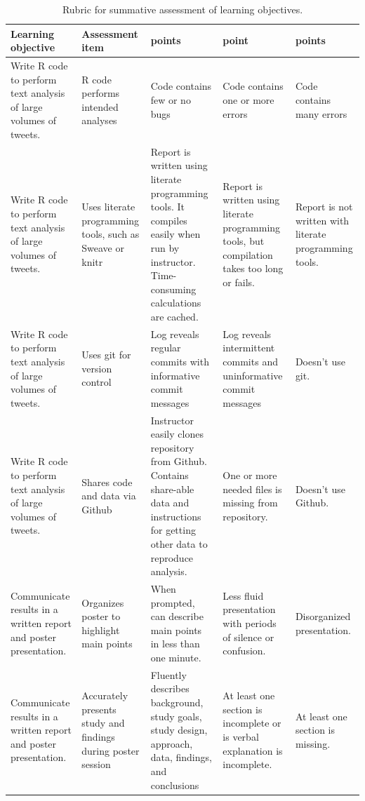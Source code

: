 \documentclass[
]{article}
\begin{document}
\begin{table}

\caption{\label{tab:summative}Rubric for summative assessment of learning objectives.}
\centering
\fontsize{6}{8}\selectfont
\begin{tabular}[t]{>{\raggedright\arraybackslash}p{10em}|>{\raggedright\arraybackslash}p{10em}|>{\raggedright\arraybackslash}p{10em}|>{\raggedright\arraybackslash}p{10em}|>{\raggedright\arraybackslash}p{10em}}
\hline
Learning objective & Assessment item & 2 points & 1 point & 0 points\\
\hline
Write R code to perform text analysis of large volumes of tweets. & R code performs intended analyses & Code contains few or no bugs & Code contains one or more errors & Code contains many errors\\
\hline
Write R code to perform text analysis of large volumes of tweets. & Uses literate programming tools, such as Sweave or knitr & Report is written using literate programming tools. It compiles easily when run by instructor. Time-consuming calculations are cached. & Report is written using literate programming tools, but compilation takes too long or fails. & Report is not written with literate programming tools.\\
\hline
Write R code to perform text analysis of large volumes of tweets. & Uses git for version control & Log reveals regular commits with informative commit messages & Log reveals intermittent commits and uninformative commit messages & Doesn't use git.\\
\hline
Write R code to perform text analysis of large volumes of tweets. & Shares code and data via Github & Instructor easily clones repository from Github. Contains share-able data and instructions for getting other data to reproduce analysis. & One or more needed files is missing from repository. & Doesn't use Github.\\
\hline
Communicate results in a written report and poster presentation. & Organizes poster to highlight main points & When prompted, can describe main points in less than one minute. & Less fluid presentation with periods of silence or confusion. & Disorganized presentation.\\
\hline
Communicate results in a written report and poster presentation. & Accurately presents study and findings during poster session & Fluently describes background, study goals, study design, approach, data, findings, and conclusions & At least one section is incomplete or is verbal explanation is incomplete. & At least one section is missing.\\

\end{tabular}
\end{table}
\end{document}
